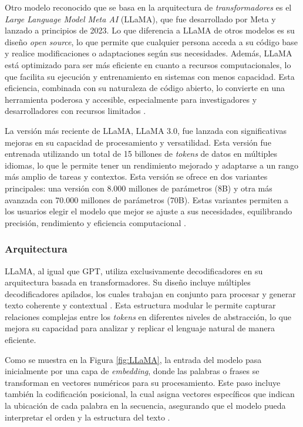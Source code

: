 Otro modelo reconocido que se basa en la arquitectura de \textit{transformadores} es el \textit{Large Language Model Meta AI} (LLaMA), que fue desarrollado por Meta y lanzado a principios de 2023. Lo que diferencia a LLaMA de otros modelos es su diseño \textit{open source}, lo que permite que cualquier persona acceda a su código base y realice modificaciones o adaptaciones según sus necesidades. Además, LLaMA está optimizado para ser más eficiente en cuanto a recursos computacionales, lo que facilita su ejecución y entrenamiento en sistemas con menos capacidad. Esta eficiencia, combinada con su naturaleza de código abierto, lo convierte en una herramienta poderosa y accesible, especialmente para investigadores y desarrolladores con recursos limitados \cite{touvron2023llama}.

La versión más reciente de LLaMA, LLaMA 3.0, fue lanzada con significativas mejoras en su capacidad de procesamiento y versatilidad. Esta versión fue entrenada utilizando un total de 15 billones de \textit{tokens} de datos en múltiples idiomas, lo que le permite tener un rendimiento mejorado y adaptarse a un rango más amplio de tareas y contextos. Esta versión se ofrece en dos variantes principales: una versión con 8.000 millones de parámetros (8B) y otra más avanzada con 70.000 millones de parámetros (70B). Estas variantes permiten a los usuarios elegir el modelo que mejor se ajuste a sus necesidades, equilibrando precisión, rendimiento y eficiencia computacional \cite{touvron2023llama}.


\subsubsection{Arquitectura}

LLaMA, al igual que GPT, utiliza exclusivamente decodificadores en su arquitectura basada en transformadores. Su diseño incluye múltiples decodificadores apilados, los cuales trabajan en conjunto para procesar y generar texto coherente y contextual \cite{touvron2023llama}. Esta estructura modular le permite capturar relaciones complejas entre los \textit{tokens} en diferentes niveles de abstracción, lo que mejora su capacidad para analizar y replicar el lenguaje natural de manera eficiente.

Como se muestra en la Figura \ref{fig:LLaMA}, la entrada del modelo pasa inicialmente por una capa de \textit{embedding}, donde las palabras o frases se transforman en vectores numéricos para su procesamiento. Este paso incluye también la codificación posicional, la cual asigna vectores específicos que indican la ubicación de cada palabra en la secuencia, asegurando que el modelo pueda interpretar el orden y la estructura del texto \cite{touvron2023llama}.

